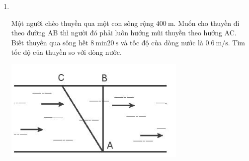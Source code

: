 \begin{enumerate}[label=\bfseries Bài \arabic*:,leftmargin=1.5cm]
{}

\item {}\\
{Một người chèo thuyền qua một con sông rộng $\SI{400}{\meter}$. Muốn cho thuyền đi theo đường AB thì người đó phải luôn hướng mũi thuyền theo hướng AC. Biết thuyền qua sông hết $\SI{8}{\minute} \SI{20}{\second}$ và tốc độ của dòng nước là $\SI{0.6}{\meter/\second}$. Tìm tốc độ của thuyền so với dòng nước.
	\begin{center}
		\includegraphics[width=0.35\linewidth]{../figs/VN10-2023-PH-TP0002-7}
	\end{center}
	
}

\end{enumerate}
